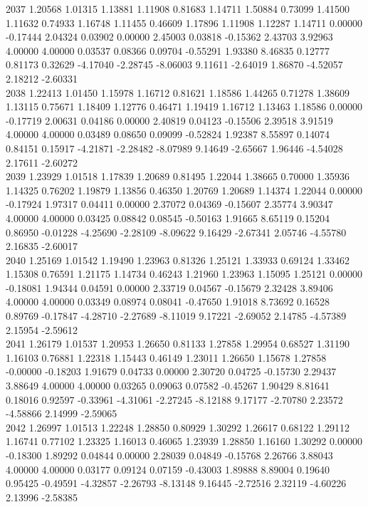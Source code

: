 {2037 1.20568 1.01315 1.13881 1.11908 0.81683 1.14711 1.50884 0.73099 1.41500 1.11632 0.74933 1.16748 1.11455 0.46609 1.17896 1.11908 1.12287 1.14711 0.00000 -0.17444 2.04324 0.03902 0.00000 2.45003 0.03818 -0.15362 2.43703 3.92963 4.00000 4.00000 0.03537 0.08366 0.09704 -0.55291 1.93380 8.46835 0.12777 0.81173 0.32629 -4.17040 -2.28745 -8.06003 9.11611 -2.64019 1.86870 -4.52057 2.18212 -2.60331 \\
2038 1.22413 1.01450 1.15978 1.16712 0.81621 1.18586 1.44265 0.71278 1.38609 1.13115 0.75671 1.18409 1.12776 0.46471 1.19419 1.16712 1.13463 1.18586 0.00000 -0.17719 2.00631 0.04186 0.00000 2.40819 0.04123 -0.15506 2.39518 3.91519 4.00000 4.00000 0.03489 0.08650 0.09099 -0.52824 1.92387 8.55897 0.14074 0.84151 0.15917 -4.21871 -2.28482 -8.07989 9.14649 -2.65667 1.96446 -4.54028 2.17611 -2.60272 \\
2039 1.23929 1.01518 1.17839 1.20689 0.81495 1.22044 1.38665 0.70000 1.35936 1.14325 0.76202 1.19879 1.13856 0.46350 1.20769 1.20689 1.14374 1.22044 0.00000 -0.17924 1.97317 0.04411 0.00000 2.37072 0.04369 -0.15607 2.35774 3.90347 4.00000 4.00000 0.03425 0.08842 0.08545 -0.50163 1.91665 8.65119 0.15204 0.86950 -0.01228 -4.25690 -2.28109 -8.09622 9.16429 -2.67341 2.05746 -4.55780 2.16835 -2.60017 \\
2040 1.25169 1.01542 1.19490 1.23963 0.81326 1.25121 1.33933 0.69124 1.33462 1.15308 0.76591 1.21175 1.14734 0.46243 1.21960 1.23963 1.15095 1.25121 0.00000 -0.18081 1.94344 0.04591 0.00000 2.33719 0.04567 -0.15679 2.32428 3.89406 4.00000 4.00000 0.03349 0.08974 0.08041 -0.47650 1.91018 8.73692 0.16528 0.89769 -0.17847 -4.28710 -2.27689 -8.11019 9.17221 -2.69052 2.14785 -4.57389 2.15954 -2.59612 \\
2041 1.26179 1.01537 1.20953 1.26650 0.81133 1.27858 1.29954 0.68527 1.31190 1.16103 0.76881 1.22318 1.15443 0.46149 1.23011 1.26650 1.15678 1.27858 -0.00000 -0.18203 1.91679 0.04733 0.00000 2.30720 0.04725 -0.15730 2.29437 3.88649 4.00000 4.00000 0.03265 0.09063 0.07582 -0.45267 1.90429 8.81641 0.18016 0.92597 -0.33961 -4.31061 -2.27245 -8.12188 9.17177 -2.70780 2.23572 -4.58866 2.14999 -2.59065 \\
2042 1.26997 1.01513 1.22248 1.28850 0.80929 1.30292 1.26617 0.68122 1.29112 1.16741 0.77102 1.23325 1.16013 0.46065 1.23939 1.28850 1.16160 1.30292 0.00000 -0.18300 1.89292 0.04844 0.00000 2.28039 0.04849 -0.15768 2.26766 3.88043 4.00000 4.00000 0.03177 0.09124 0.07159 -0.43003 1.89888 8.89004 0.19640 0.95425 -0.49591 -4.32857 -2.26793 -8.13148 9.16445 -2.72516 2.32119 -4.60226 2.13996 -2.58385 \\
}

